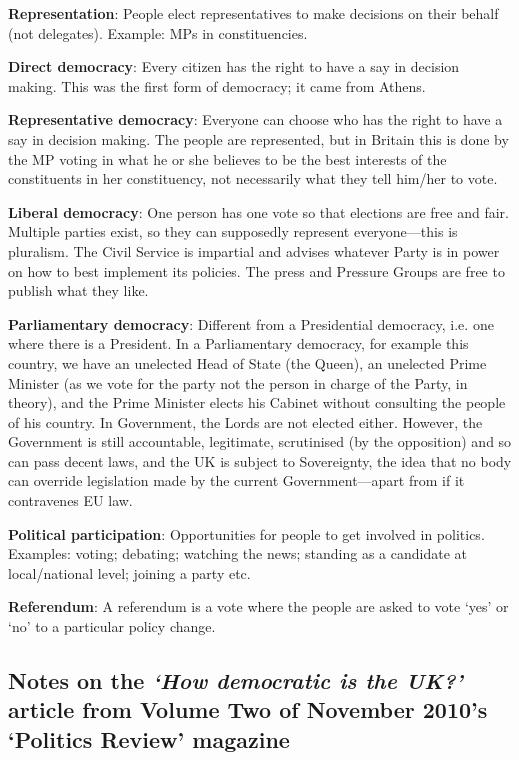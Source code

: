 \documentclass[12pt]{article}
\begin{document}
		\textbf{Representation}: People elect representatives to make decisions on their behalf (not delegates).  Example: MPs in constituencies. 

		\textbf{Direct democracy}: Every citizen has the right to have a say in decision making.  This was the first form of democracy; it came from Athens.

		\textbf{Representative democracy}: Everyone can choose who has the right to have a say in decision making.  The people are represented, but in Britain this is done by the MP voting in what he or she believes to be the best interests of the constituents in her constituency, not necessarily what they tell him/her to vote.

		\textbf{Liberal democracy}: One person has one vote so that elections are free and fair.  Multiple parties exist, so they can supposedly represent everyone---this is pluralism.  The Civil Service is impartial and advises whatever Party is in power on how to best implement its policies.  The press and Pressure Groups are free to publish what they like.

		\textbf{Parliamentary democracy}: Different from a Presidential democracy, i.e. one where there is a President.  In a Parliamentary democracy, for example this country, we have an unelected Head of State (the Queen), an unelected Prime Minister (as we vote for the party not the person in charge of the Party, in theory), and the Prime Minister elects his Cabinet without consulting the people of his country.  In Government, the Lords are not elected either.  However, the Government is still accountable, legitimate, scrutinised (by the opposition) and so can pass decent laws, and the UK is subject to Sovereignty, the idea that no body can override legislation made by the current Government---apart from if it contravenes EU law.

		\textbf{Political participation}: Opportunities for people to get involved in politics.  Examples: voting; debating; watching the news; standing as a candidate at local/national level; joining a party etc.

		\textbf{Referendum}: A referendum is a vote where the people are asked to vote `yes' or `no' to a particular policy change.

	\subsection*{Notes on the \textsl{`How democratic is the UK?'} article from Volume Two of November 2010's `Politics Review' magazine}
	
\end{document}
